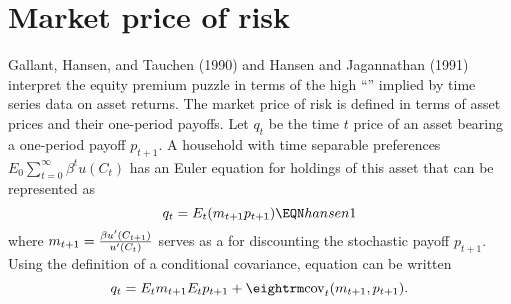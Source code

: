 
\section{Market price of risk}

    Gallant, Hansen, and Tauchen (1990) and Hansen and
Jagannathan (1991) interpret the equity premium puzzle in terms
of the high ``'' implied by time series
data on asset returns.   The market price of risk
is defined in terms of asset prices and their one-period payoffs.
Let $q_t$ be the time $t$ price of an asset bearing
a one-period payoff $p_{t+1}$.    A household with time separable preferences
$ E_0 \sum_{t=0}^\infty \beta^t  u(C_t)$ has an  Euler equation for
holdings of this asset that can be represented as
$$ q_t = E_t (m_{t+1} p_{t+1}) \EQN hansen1 $$
where $m_{t+1} = {\beta u'(C_{t+1}) \over u'(C_t)}$ serves
as a  for discounting the
stochastic payoff $p_{t+1}$.
Using the definition of a conditional covariance,
equation  can be written
$$ q_t = E_t m_{t+1} E_t p_{t+1} + {\rm cov}_t (m_{t+1}, p_{t+1}) .$$

